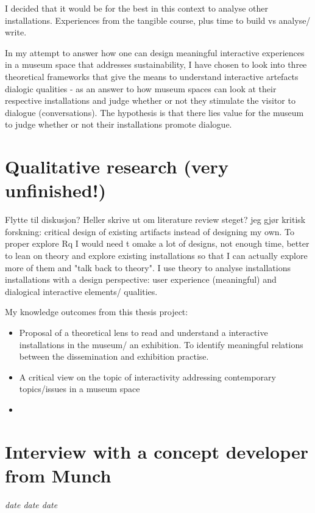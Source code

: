 I decided that it would be for the best in this context to analyse other installations. Experiences from the tangible course, plus time to build vs analyse/ write. 


In my attempt to answer how one can design meaningful interactive experiences in a museum space that addresses sustainability, I have chosen to look into three theoretical frameworks that give the means to understand interactive artefacts dialogic qualities - as an answer to how museum spaces can look at their respective installations and judge whether or not they stimulate the visitor to dialogue (conversations). The hypothesis is that there lies value for the museum to judge whether or not their installations promote dialogue. 


\section{Qualitative research (very unfinished!)}
Flytte til diskusjon? Heller skrive ut om literature review steget?
jeg gjør kritisk forskning: critical design of existing artifacts instead of designing my own. To proper explore Rq I would need t omake a lot of designs, not enough time, better to lean on theory and explore existing installations so that I can actually explore more of them and "talk back to theory". I use theory to analyse installations installations with a design perspective: user experience (meaningful) and dialogical interactive elements/ qualities. 


My knowledge outcomes from this thesis project:
\begin{itemize}
    \item Proposal of a theoretical lens to read and understand a interactive installations in the museum/ an exhibition. To identify meaningful relations between the dissemination and exhibition practise.
    \item A critical view on the topic of interactivity addressing contemporary topics/issues in a museum space
    \item 
\end{itemize}

\section{Interview with a concept developer from Munch}
\par
\emph{date date date}
\par

